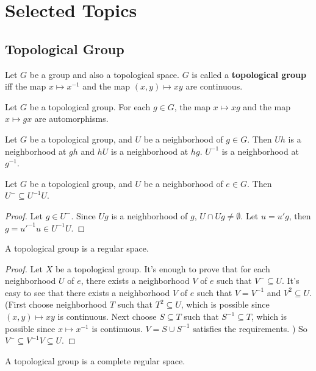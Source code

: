 \documentclass[12pt]{book}
\begin{document}
\chapter{Selected Topics}
\section{Topological Group}
\begin{definition}
	Let $G$ be a group and also a topological space. $G$ is called a {\bf topological group} iff the map $x\mapsto x^{-1}$ and the map $(x,y)\mapsto xy$ are continuous.
\end{definition}
\begin{theorem}
	Let $G$ be a topological group. For each $g\in G$, the map $x\mapsto xg$ and the map $x\mapsto gx$ are automorphisms.
\end{theorem}
\begin{theorem}
	Let $G$ be a topological group, and $U$ be a neighborhood of $g\in G$. Then $Uh$ is a neighborhood at $gh$ and $hU$ is a neighborhood at $hg$. $U^{-1}$ is a neighborhood at $g^{-1}$.
\end{theorem}
\begin{lemma}
	Let $G$ be a topological group, and $U$ be a neighborhood of $e\in G$. Then $U^-\subseteq U^{-1}U$.
\end{lemma}
\begin{proof}
	Let $g\in U^-$. Since $Ug$ is a neighborhood of $g$, $U\cap Ug\neq \emptyset$. Let $u=u'g$, then $g=u'^{-1}u\in U^{-1}U$.
\end{proof}
\begin{theorem}
	A topological group is a regular space.
\end{theorem}
\begin{proof}
	Let $X$ be a topological group. It's enough to prove that for each neighborhood $U$ of $e$, there exists a neighborhood $V$ of $e$ such that $V^-\subseteq U$. It's easy to see that there exists a neighborhood $V$ of $e$ such that $V=V^{-1}$ and $V^2\subseteq U$.  (First choose neighborhood $T$ such that $T^2\subseteq U$, which is possible since $(x,y)\mapsto xy$ is continuous. Next choose $S\subseteq T$ such that $S^{-1}\subseteq T$, which is possible since $x\mapsto x^{-1}$ is continuous. $V=S\cup S^{-1}$ satisfies the requirements. ) So $V^{-}\subseteq V^{-1} V\subseteq U$.
\end{proof}
\begin{theorem}
	A topological group is a complete regular space.
\end{theorem}
\end{document}
